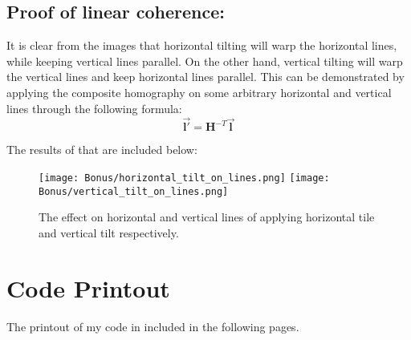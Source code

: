 \documentclass{article}
\begin{document}
\subsection{Proof of linear coherence:}
It is clear from the images that horizontal tilting will warp the horizontal lines, while keeping vertical lines parallel. On the other hand, vertical tilting will warp the vertical lines and keep horizontal lines parallel. This can be demonstrated by applying the composite homography on some arbitrary horizontal and vertical lines through the following formula:
\[\boldsymbol{\Vec{l'}} = \boldsymbol{H}^{-T} \boldsymbol{\Vec{l}}\]

The results of that are included below:
\begin{figure}[H]
    \centering
    \texttt{[image: Bonus/horizontal\_tilt\_on\_lines.png]}
    \texttt{[image: Bonus/vertical\_tilt\_on\_lines.png]}
    \caption{The effect on horizontal and vertical lines of applying horizontal tile and vertical tilt respectively.}
    \label{fig:enter-label}
\end{figure}
\section{Code Printout} \label{sec:code-printout}
The printout of my code in included in the following pages.

\end{document}
